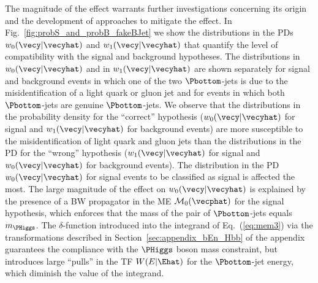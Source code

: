 The magnitude of the effect warrants further investigations concerning its origin and the development of approaches to mitigate the effect.
In Fig.~\ref{fig:probS_and_probB_fakeBJet} we show the distributions in the PDs $w_{0}(\vecy|\vecyhat)$ and $w_{1}(\vecy|\vecyhat)$
that quantify the level of compatibility with the signal and background hypotheses.
The distributions in $w_{0}(\vecy|\vecyhat)$ and in $w_{1}(\vecy|\vecyhat)$ are shown separately 
for signal and background events in which one of the two $\Pbottom$-jets is due to the misidentification of a light quark or gluon jet
and for events in which both $\Pbottom$-jets are genuine $\Pbottom$-jets.
We observe that the distributions in the probability density for the ``correct'' hypothesis 
($w_{0}(\vecy|\vecyhat)$ for signal and $w_{1}(\vecy|\vecyhat)$ for background events)
are more susceptible to the misidentification of light quark and gluon jets than the distributions in the PD for the ``wrong'' hypothesis 
($w_{1}(\vecy|\vecyhat)$ for signal and $w_{0}(\vecy|\vecyhat)$ for background events).
The distribution in the PD $w_{0}(\vecy|\vecyhat)$ for signal events to be classified as signal is affected the most.
The large magnitude of the effect on $w_{0}(\vecy|\vecyhat)$ is explained by the presence of a BW propagator in the ME $\mathcal{M}_{0}(\vecphat)$ for the signal hypothesis,
which enforces that the mass of the pair of $\Pbottom$-jets equals $m_{\PHiggs}$.
The $\delta$-function introduced into the integrand of Eq.~(\ref{eq:mem3}) via the transformations described in Section~\ref{sec:appendix_bEn_Hbb} of the appendix
guarantees the compliance with the $\PHiggs$ boson mass constraint,
but introduces large ``pulls'' in the TF $W(E|\Ehat)$ for the $\Pbottom$-jet energy,
which diminish the value of the integrand.

